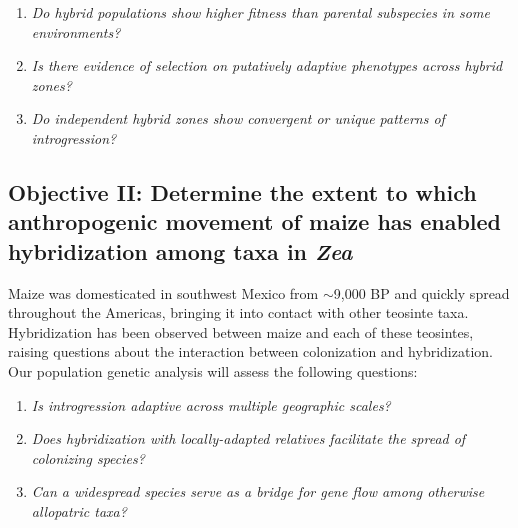 \begin{enumerate}
\item \emph{Do hybrid populations show higher fitness than parental subspecies in some environments?}
\item \emph{Is there evidence of selection on putatively adaptive phenotypes across hybrid zones?}
\item \emph{Do independent hybrid zones show convergent or unique patterns of introgression?}
\end{enumerate}

\subsection*{Objective II: Determine the extent to which anthropogenic movement of maize has enabled hybridization among taxa in \emph{Zea}}
Maize was domesticated in southwest Mexico from \zp{} $\sim$9,000 BP \citep{Matsuoka2002} and quickly spread throughout the Americas, bringing it into contact with other teosinte taxa.
Hybridization has been observed between maize and each of these teosintes, raising questions about the interaction between colonization and hybridization. 
Our population genetic analysis will assess the following questions:
\begin{enumerate}
\item \emph{Is introgression adaptive across multiple geographic scales?}
\item \emph{Does hybridization with locally-adapted relatives facilitate the spread of colonizing species?}
\item \emph{Can a widespread species serve as a bridge for gene flow among otherwise allopatric taxa?} 
\end{enumerate}

